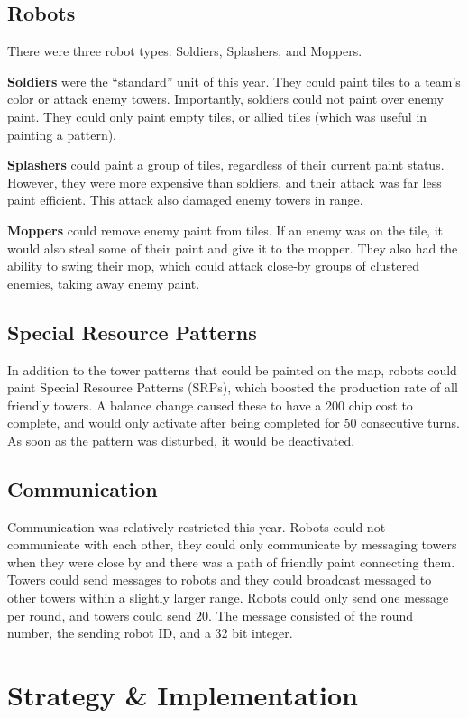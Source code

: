 \documentclass{article}
\begin{document}
  \subsection{Robots}

  There were three robot types: Soldiers, Splashers, and Moppers.

  \medskip

  \textbf{Soldiers} were the ``standard'' unit of this year. They could paint tiles to a team's color or attack enemy towers. Importantly, soldiers could not paint over enemy paint. They could only paint empty tiles, or allied tiles (which was useful in painting a pattern).

  \medskip

  \textbf{Splashers} could paint a group of tiles, regardless of their current paint status. However, they were more expensive than soldiers, and their attack was far less paint efficient. This attack also damaged enemy towers in range.

  \medskip

  \textbf{Moppers} could remove enemy paint from tiles. If an enemy was on the tile, it would also steal some of their paint and give it to the mopper. They also had the ability to swing their mop, which could attack close-by groups of clustered enemies, taking away enemy paint.

  \subsection{Special Resource Patterns}

  In addition to the tower patterns that could be painted on the map, robots could paint Special Resource Patterns (SRPs), which boosted the production rate of all friendly towers. A balance change caused these to have a 200 chip cost to complete, and would only activate after being completed for 50 consecutive turns. As soon as the pattern was disturbed, it would be deactivated.

  \subsection{Communication}

  Communication was relatively restricted this year. Robots could not communicate with each other, they could only communicate by messaging towers when they were close by and there was a path of friendly paint connecting them. Towers could send messages to robots and they could broadcast messaged to other towers within a slightly larger range. Robots could only send one message per round, and towers could send 20. The message consisted of the round number, the sending robot ID, and a 32 bit integer.

  \section{Strategy \& Implementation}

  
\end{document}
